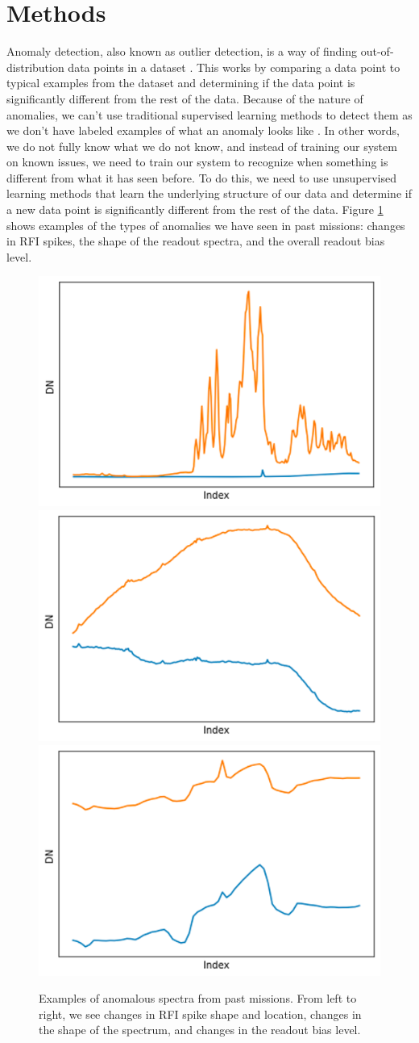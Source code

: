 \section{Methods}
\label{spectra/sec:methods}
Anomaly detection, also known as outlier detection, is a way of finding out-of-distribution data points in a dataset \parencite{kerner2022domain}.
This works by comparing a data point to typical examples from the dataset and determining if the data point is significantly different from the rest of the data.
Because of the nature of anomalies, we can't use traditional supervised learning methods to detect them as we don't have labeled examples of what an anomaly looks like \parencite{horton2021integrating}.
In other words, we do not fully know what we do not know, and instead of training our system on known issues, we need to train our system to recognize when something is different from what it has seen before.
To do this, we need to use unsupervised learning methods that learn the underlying structure of our data and determine if a new data point is significantly different from the rest of the data.
Figure \ref{spectra/fig:examples} shows examples of the types of anomalies we have seen in past missions: changes in RFI spikes, the shape of the readout spectra, and the overall readout bias level.

\begin{figure}
    \centering
    \includegraphics[width=0.3\linewidth]{figs/spectra/Anom1.png}
    \includegraphics[width=0.3\linewidth]{figs/spectra/anom2.png}
    \includegraphics[width=0.3\linewidth]{figs/spectra/anom3.png}
    \caption[Examples of Anomalous Spectra from Past Missions]{Examples of anomalous spectra from past missions. From left to right, we see changes in RFI spike shape and location, changes in the shape of the spectrum, and changes in the readout bias level.}
    \label{spectra/fig:examples}
\end{figure}


